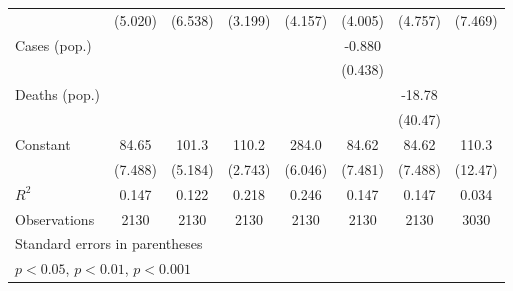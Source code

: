 \documentclass{article}
\begin{document}
{\begin{longtable}{l*{7}{c}}
                &  (5.020)         &  (6.538)         &  (3.199)         &  (4.157)         &  (4.005)         &  (4.757)         &  (7.469)         \\
Cases (pop.)    &                  &                  &                  &                  &   -0.880         &                  &                  \\
                &                  &                  &                  &                  &  (0.438)         &                  &                  \\
Deaths (pop.)   &                  &                  &                  &                  &                  &   -18.78         &                  \\
                &                  &                  &                  &                  &                  &  (40.47)         &                  \\
Constant        &    84.65\sym{***}&    101.3\sym{***}&    110.2\sym{***}&    284.0\sym{***}&    84.62\sym{***}&    84.62\sym{***}&    110.3\sym{***}\\
                &  (7.488)         &  (5.184)         &  (2.743)         &  (6.046)         &  (7.481)         &  (7.488)         &  (12.47)         \\
\hline
\(R^{2}\)       &    0.147         &    0.122         &    0.218         &    0.246         &    0.147         &    0.147         &    0.034         \\
Observations    &     2130         &     2130         &     2130         &     2130         &     2130         &     2130         &     3030         \\
\hline\hline
\multicolumn{8}{l}{\footnotesize Standard errors in parentheses}\\
\multicolumn{8}{l}{\footnotesize \sym{*} \(p<0.05\), \sym{**} \(p<0.01\), \sym{***} \(p<0.001\)}\\
\end{longtable}
}
\end{document}
